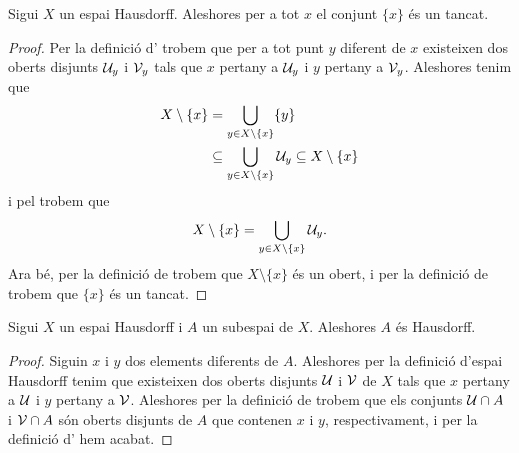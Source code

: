 \documentclass[../../Main.tex]{subfiles}
\begin{document}
	\begin{proposition}
		\label{prop:els punts en un Hausdorff són tancats}
		Sigui \(X\) un espai Hausdorff. Aleshores per a tot \(x\) el conjunt \(\{x\}\) és un tancat.
		\begin{proof}
			Per la definició d' trobem que per a tot punt \(y\) diferent de \(x\) existeixen dos oberts disjunts \(\mathcal{U}_{y}\) i \(\mathcal{V}_{y}\) tals que \(x\) pertany a \(\mathcal{U}_{y}\) i \(y\) pertany a \(\mathcal{V}_{y}\). Aleshores tenim que
			\begin{align*}
				X\setminus\{x\}&=\bigcup_{y\in X\setminus\{x\}}\{y\} \\
				&\subseteq\bigcup_{y\in X\setminus\{x\}}\mathcal{U}_{y}\subseteq X\setminus\{x\}
			\end{align*}
			i pel  trobem que
			\[
			    X\setminus\{x\}=\bigcup_{y\in X\setminus\{x\}}\mathcal{U}_{y}.
			\]
			Ara bé, per la definició de  trobem que \(X\setminus\{x\}\) és un obert, i per la definició de  trobem que \(\{x\}\) és un tancat.
		\end{proof}
	\end{proposition}
	\begin{proposition}
		\label{prop:els subespais d'un Hausdorff són Hausdorff}
		Sigui \(X\) un espai Hausdorff i \(A\) un subespai de \(X\). Aleshores \(A\) és Hausdorff.
		\begin{proof}
			Siguin \(x\) i \(y\) dos elements diferents de \(A\). Aleshores per la definició d'espai Hausdorff tenim que existeixen dos oberts disjunts \(\mathcal{U}\) i \(\mathcal{V}\) de \(X\) tals que \(x\) pertany a \(\mathcal{U}\) i \(y\) pertany a \(\mathcal{V}\). Aleshores per la definició de  trobem que els conjunts \(\mathcal{U}\cap A\) i \(\mathcal{V}\cap A\) són oberts disjunts de \(A\) que contenen \(x\) i \(y\), respectivament, i per la definició d' hem acabat.
		\end{proof}
	\end{proposition}
\end{document}
